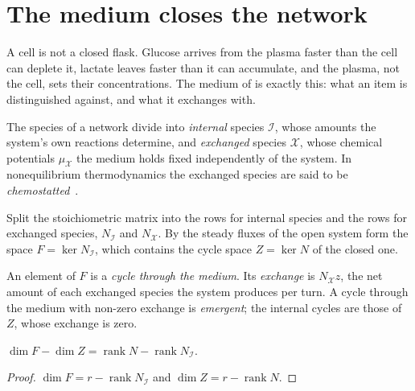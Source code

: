 \section{The medium closes the network}
\label{c1:sec-medium}

A cell is not a closed flask. Glucose arrives from the plasma faster than
the cell can deplete it, lactate leaves faster than it can accumulate, and
the plasma, not the cell, sets their concentrations. The medium of
 is exactly this: what an item is distinguished
against, and what it exchanges with.

\begin{inputstmt}[Reservoir]
\label{c1:in-reservoir}
\lnkS{} The species of a network divide into \emph{internal} species
$\mathcal I$, whose amounts the system's own reactions determine, and
\emph{exchanged} species $\mathcal X$, whose chemical potentials
$\mu_{\mathcal X}$ the medium holds fixed independently of the system. In
nonequilibrium thermodynamics the exchanged species are said to be
\emph{chemostatted}~\citep{polettini2014}.
\end{inputstmt}

Split the stoichiometric matrix into the rows for internal species and the
rows for exchanged species, $N_{\mathcal I}$ and $N_{\mathcal X}$. By
 the steady fluxes of the open system form the space
$F=\ker N_{\mathcal I}$, which contains the cycle space $Z=\ker N$ of the
closed one.

\begin{definition}
\label{c1:def-emergent}
An element of $F$ is a \emph{cycle through the medium}. Its \emph{exchange}
is $N_{\mathcal X}z$, the net amount of each exchanged species the system
produces per turn. A cycle through the medium with non-zero exchange is
\emph{emergent}; the internal cycles are those of $Z$, whose exchange is
zero.
\end{definition}

\begin{proposition}
\label{c1:prop-count}
\lnkD{} $\dim F-\dim Z=\operatorname{rank}N-\operatorname{rank}N_{\mathcal I}$.
\end{proposition}

\begin{proof}
$\dim F=r-\operatorname{rank}N_{\mathcal I}$ and
$\dim Z=r-\operatorname{rank}N$.
\end{proof}


